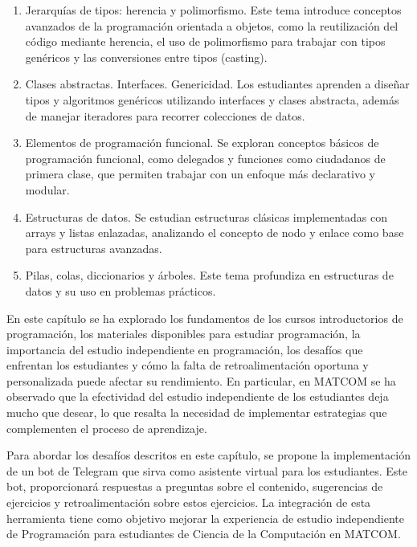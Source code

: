 \documentclass{article}
\begin{document}
\begin{enumerate}
    \item Jerarquías de tipos: herencia y polimorfismo.
    Este tema introduce conceptos avanzados de la programación orientada a objetos, como la reutilización del código mediante herencia, el uso de polimorfismo para trabajar con tipos genéricos y las conversiones entre tipos (casting).  

    \item Clases abstractas. Interfaces. Genericidad.
    Los estudiantes aprenden a diseñar tipos y algoritmos genéricos utilizando interfaces y clases abstracta, además de manejar iteradores para recorrer colecciones de datos.

    \item Elementos de programación funcional.
    Se exploran conceptos básicos de programación funcional, como delegados y funciones como ciudadanos de primera clase, que permiten trabajar con un enfoque más declarativo y modular.

    \item Estructuras de datos.
    Se estudian estructuras clásicas implementadas con arrays y listas enlazadas, analizando el concepto de nodo y enlace como base para estructuras avanzadas.  

    \item Pilas, colas, diccionarios y árboles.
    Este tema profundiza en estructuras de datos y su uso en problemas prácticos.
\end{enumerate}

En este capítulo se ha explorado los fundamentos de los cursos introductorios de programación, los materiales disponibles para estudiar programación, la importancia del estudio independiente en programación, los desafíos que enfrentan los estudiantes y cómo la falta de retroalimentación oportuna y personalizada puede afectar su rendimiento. En particular, en \mbox{MATCOM} se ha observado que la efectividad del estudio independiente de los estudiantes deja mucho que desear, lo que resalta la necesidad de implementar estrategias que complementen el proceso de aprendizaje.

Para abordar los desafíos descritos en este capítulo, se propone la implementación de un bot de Telegram que sirva como asistente virtual para los estudiantes. Este bot, proporcionará respuestas a preguntas sobre el contenido, sugerencias de ejercicios y retroalimentación sobre estos ejercicios. La integración de esta herramienta tiene como objetivo mejorar la experiencia de estudio independiente de Programación para estudiantes de Ciencia de la Computación en \mbox{MATCOM}.
\end{document}
